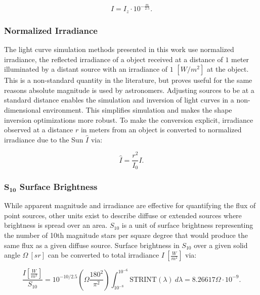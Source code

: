 \begin{equation} \label{eq:mag_to_irradiance}
  I = I_z \cdot 10^{-\frac{m}{2.5}}.
\end{equation}

\subsubsection{Normalized Irradiance}

The light curve simulation methods presented in this work use normalized irradiance, 
the reflected irradiance of a object received at a distance of $1$ meter illuminated by a distant source with an irradiance of $1$ $\left[ W/m^2 \right]$ at the object. This is a non-standard quantity in the literature, but proves useful for the same reasons absolute magnitude is used by astronomers. Adjusting sources to be at a standard distance enables the simulation and inversion of light curves in a non-dimensional environment. This simplifies simulation and makes the shape inversion optimizations more robust. To make the conversion explicit, irradiance observed at a distance $r$ in meters from an object is converted to normalized irradiance due to the Sun $\hat{I}$ via:

\begin{equation} \label{eq:irradiance_to_norm_irradiance}
  \hat{I} = \frac{r^2}{I_0} I.
\end{equation}

\subsubsection{$\mathbf{S_{10}}$ Surface Brightness}

While apparent magnitude and irradiance are effective for quantifying the flux of point sources, other units exist
to describe diffuse or extended sources where brightness is spread over an
area. $S_{10}$ is a unit of surface brightness representing the number of 10th magnitude stars per square degree that would produce the same flux as a given diffuse source.
Surface brightness in $S_{10}$ over a given solid angle $\Omega \: \left[ sr \right]$ can be converted to total irradiance $I \: \left[ \frac{W}{m^2} \right]$ via:

\begin{equation} \label{eq:s10toirrad}
 \frac{I \left[ \frac{W}{m^2} \right]}{S_{10}} = 10^{-10/2.5} \left( \Omega \frac{180^2}{\pi^2} \right)
  \int_{10^{-8}}^{10^{-6}}{ \textrm{STRINT}(\lambda) \: d\lambda} = 8.26617 \Omega \cdot 10^{-9}.
\end{equation}

